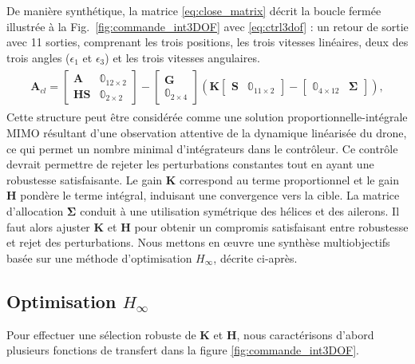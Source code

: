 De manière synthétique, la matrice \eqref{eq:close_matrix} décrit la boucle fermée illustrée à la Fig.~\ref{fig:commande_int3DOF} avec \eqref{eq:ctrl3dof} : un retour de sortie avec 11 sorties, comprenant les trois positions, les trois vitesses linéaires, deux des trois angles ($\epsilon_{1}$ et $\epsilon_{3}$) et les trois vitesses angulaires.
\begin{align} \label{eq:close_matrix}
    \begin{gathered}
        \boldsymbol{A}_{cl} \!= \!
        \begin{bmatrix}\boldsymbol{A} & \mathbb{0}_{12\times 2} \\ \boldsymbol{H}\boldsymbol{S} & \mathbb{0}_{2\times 2}\end{bmatrix} \!- \!\begin{bmatrix}\boldsymbol{G} \\ \mathbb{0}_{2\times 4}\end{bmatrix} \left( \boldsymbol{K} \begin{bmatrix}\boldsymbol{S} & \mathbb{0}_{11\times 2}\end{bmatrix} -  \begin{bmatrix}\mathbb{0}_{4\times 12} & \boldsymbol{\Sigma} \end{bmatrix}\right),
    \end{gathered}
\end{align}
Cette structure peut être considérée comme une solution proportionnelle-intégrale MIMO  résultant d'une observation attentive de la dynamique linéarisée du drone, ce qui permet un nombre minimal d'intégrateurs dans le contrôleur. Ce contrôle devrait permettre de rejeter les perturbations constantes tout en ayant une robustesse satisfaisante. Le gain $\boldsymbol{K}$ correspond au terme proportionnel et le gain $\boldsymbol{H}$ pondère le terme intégral, induisant une convergence vers la cible. La matrice d'allocation $\boldsymbol{\Sigma}$ conduit à une utilisation symétrique des hélices et des ailerons. Il faut alors ajuster $\boldsymbol{K}$ et $\boldsymbol{H}$ pour obtenir un compromis satisfaisant entre robustesse et rejet des perturbations. Nous mettons en œuvre une synthèse multiobjectifs basée sur une méthode d'optimisation $H_{\infty}$, décrite ci-après.

\subsection{Optimisation $H_{\infty}$}
 \label{sec:h_inf3DOF}
Pour effectuer une sélection robuste de $\boldsymbol{K}$ et $\boldsymbol{H}$, nous caractérisons d'abord plusieurs fonctions de transfert dans la figure \ref{fig:commande_int3DOF}.

